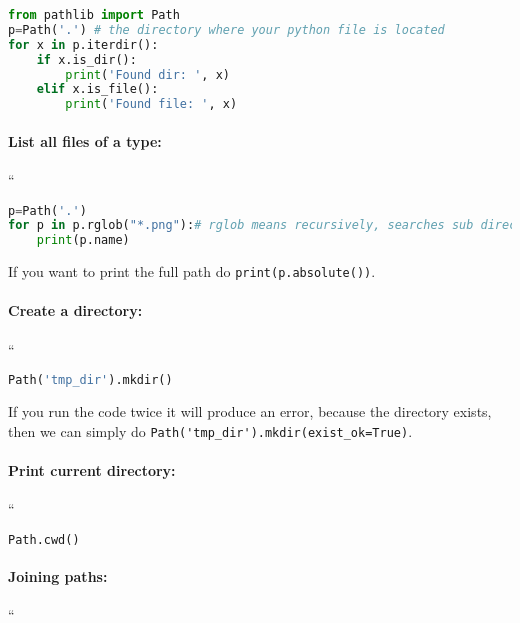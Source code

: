 \documentclass[graybox,sectrefs,envcountresetchap,open=right,final]{svmonodo}
\begin{document}
\begin{lstlisting}[language=python,style=blue1bar]
from pathlib import Path
p=Path('.') # the directory where your python file is located
for x in p.iterdir():
    if x.is_dir():
        print('Found dir: ', x)
    elif x.is_file():
        print('Found file: ', x)

\end{lstlisting}


\paragraph{List all files of a type:}
``




\begin{lstlisting}[language=python,style=blue1bar]
p=Path('.')
for p in p.rglob("*.png"):# rglob means recursively, searches sub directories
    print(p.name)

\end{lstlisting}

If you want to print the full path do \texttt{print(p.absolute())}.

\paragraph{Create a directory:}
``


\begin{lstlisting}[language=python,style=blue1bar]
Path('tmp_dir').mkdir()

\end{lstlisting}

If you run the code twice it will produce an error, because the directory exists, then we can simply do \Verb!Path('tmp_dir').mkdir(exist_ok=True)!.

\paragraph{Print current directory:}
``


\begin{lstlisting}[language=python,style=blue1bar]
Path.cwd()

\end{lstlisting}


\paragraph{Joining paths:}
``
\end{document}
